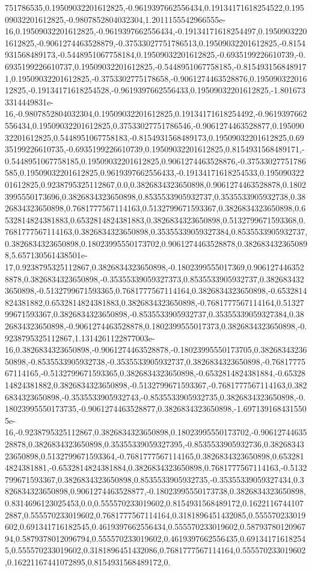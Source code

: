 751786535,0.19509032201612825,-0.9619397662556434,0.19134171618254522,0.19509032201612825,-0.9807852804032304,1.2011155542966555e-16,0.19509032201612825,-0.9619397662556434,-0.19134171618254497,0.19509032201612825,-0.9061274463528879,-0.37533027751786513,0.19509032201612825,-0.8154931568489173,-0.5448951067758184,0.19509032201612825,-0.6935199226610739,-0.6935199226610737,0.19509032201612825,-0.5448951067758185,-0.8154931568489171,0.19509032201612825,-0.3753302775178658,-0.9061274463528876,0.19509032201612825,-0.19134171618254528,-0.9619397662556433,0.19509032201612825,-1.8016733314449831e-16,-0.9807852804032304,0.19509032201612825,0.19134171618254492,-0.9619397662556434,0.19509032201612825,0.37533027751786546,-0.9061274463528877,0.19509032201612825,0.5448951067758183,-0.8154931568489173,0.19509032201612825,0.6935199226610735,-0.6935199226610739,0.19509032201612825,0.8154931568489171,-0.5448951067758185,0.19509032201612825,0.9061274463528876,-0.37533027751786585,0.19509032201612825,0.9619397662556433,-0.19134171618254533,0.19509032201612825,0.9238795325112867,0.0,0.3826834323650898,0.9061274463528878,0.18023995550173696,0.3826834323650898,0.8535533905932737,0.3535533905932738,0.3826834323650898,0.7681777567114163,0.5132799671593367,0.3826834323650898,0.6532814824381883,0.6532814824381883,0.3826834323650898,0.5132799671593368,0.7681777567114163,0.3826834323650898,0.35355339059327384,0.8535533905932737,0.3826834323650898,0.18023995550173702,0.9061274463528878,0.3826834323650898,5.657130561438501e-17,0.9238795325112867,0.3826834323650898,-0.1802399555017369,0.9061274463528878,0.3826834323650898,-0.35355339059327373,0.8535533905932737,0.3826834323650898,-0.5132799671593365,0.7681777567114164,0.3826834323650898,-0.6532814824381882,0.6532814824381883,0.3826834323650898,-0.7681777567114164,0.5132799671593367,0.3826834323650898,-0.8535533905932737,0.35355339059327384,0.3826834323650898,-0.9061274463528878,0.1802399555017373,0.3826834323650898,-0.9238795325112867,1.1314261122877003e-16,0.3826834323650898,-0.9061274463528878,-0.18023995550173705,0.3826834323650898,-0.8535533905932738,-0.3535533905932737,0.3826834323650898,-0.7681777567114165,-0.5132799671593365,0.3826834323650898,-0.6532814824381884,-0.6532814824381882,0.3826834323650898,-0.5132799671593367,-0.7681777567114163,0.3826834323650898,-0.3535533905932743,-0.8535533905932735,0.3826834323650898,-0.18023995550173735,-0.9061274463528877,0.3826834323650898,-1.6971391684315505e-16,-0.9238795325112867,0.3826834323650898,0.18023995550173702,-0.9061274463528878,0.3826834323650898,0.35355339059327395,-0.8535533905932736,0.3826834323650898,0.5132799671593364,-0.7681777567114165,0.3826834323650898,0.6532814824381881,-0.6532814824381884,0.3826834323650898,0.7681777567114163,-0.5132799671593367,0.3826834323650898,0.8535533905932735,-0.35355339059327434,0.3826834323650898,0.9061274463528877,-0.18023995550173738,0.3826834323650898,0.8314696123025453,0.0,0.555570233019602,0.8154931568489172,0.16221167441072887,0.555570233019602,0.7681777567114164,0.3181896451432085,0.555570233019602,0.691341716182545,0.4619397662556434,0.555570233019602,0.5879378012096794,0.5879378012096794,0.555570233019602,0.4619397662556435,0.691341716182545,0.555570233019602,0.3181896451432086,0.7681777567114164,0.555570233019602,0.16221167441072895,0.8154931568489172,0.